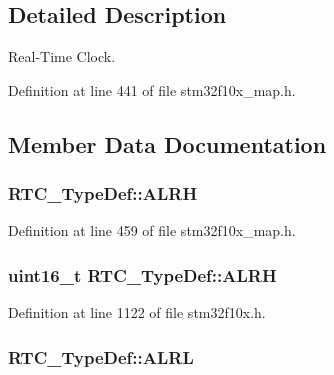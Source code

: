 \subsection{Detailed Description}
Real-\/\+Time Clock. 

Definition at line 441 of file stm32f10x\+\_\+map.\+h.



\subsection{Member Data Documentation}
\subsubsection[{\texorpdfstring{A\+L\+RH}{ALRH}}]{ R\+T\+C\+\_\+\+Type\+Def\+::\+A\+L\+RH}\hypertarget{struct_r_t_c___type_def_ab1953085df504292f935c19ce08a13cf}{}\label{struct_r_t_c___type_def_ab1953085df504292f935c19ce08a13cf}


Definition at line 459 of file stm32f10x\+\_\+map.\+h.

\subsubsection[{\texorpdfstring{A\+L\+RH}{ALRH}}]{ {\bf uint16\+\_\+t} R\+T\+C\+\_\+\+Type\+Def\+::\+A\+L\+RH}\hypertarget{struct_r_t_c___type_def_a873ee28923e732677a3a58971bdc9e6b}{}\label{struct_r_t_c___type_def_a873ee28923e732677a3a58971bdc9e6b}


Definition at line 1122 of file stm32f10x.\+h.

\subsubsection[{\texorpdfstring{A\+L\+RL}{ALRL}}]{ R\+T\+C\+\_\+\+Type\+Def\+::\+A\+L\+RL}\hypertarget{struct_r_t_c___type_def_a9916eeac20bfea24814c2fd2a46994c8}{}\label{struct_r_t_c___type_def_a9916eeac20bfea24814c2fd2a46994c8}


